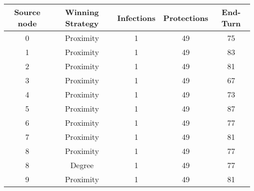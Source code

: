 \documentclass[results.tex]{subfiles}
\begin{document}
    \begin{center}
        \begin{tabular}{| c || c | c | c | c |}
            \hline
            {\bfseries Source node} & {\bfseries Winning Strategy} & {\bfseries Infections} & {\bfseries Protections}
            & {\bfseries End-Turn}
            \\  %
            \hline\hline
            0                       & Proximity                    & 1                      & 49                      & 75                   \\
            \hline
            1                       & Proximity                    & 1                      & 49                      & 83                   \\
            \hline
            2                       & Proximity                    & 1                      & 49                      & 81                   \\
            \hline
            3                       & Proximity                    & 1                      & 49                      & 67                   \\
            \hline
            4                       & Proximity                    & 1                      & 49                      & 73                   \\
            \hline
            5                       & Proximity                    & 1                      & 49                      & 87                   \\
            \hline
            6                       & Proximity                    & 1                      & 49                      & 77                   \\
            \hline
            7                       & Proximity                    & 1                      & 49                      & 81                   \\
            \hline
            8                       & Proximity                    & 1                      & 49                      & 77                   \\
            \hline
            8                       & Degree                       & 1                      & 49                      & 77                   \\
            \hline
            9                       & Proximity                    & 1                      & 49                      & 81                   \\

\end{tabular}
\end{center}
\end{document}
